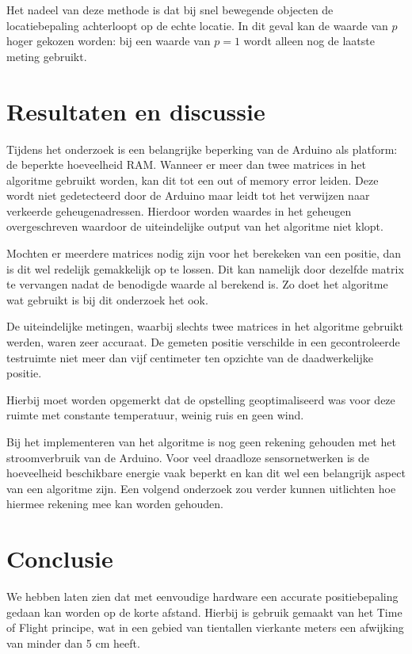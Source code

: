 \documentclass[a4paper,10pt]{article}
\begin{document}
Het nadeel van deze methode is dat bij snel bewegende objecten de locatiebepaling achterloopt op de echte locatie. In dit geval kan de waarde van $p$ hoger gekozen worden: bij een waarde van $p = 1$ wordt alleen nog de laatste meting gebruikt.

\section{Resultaten en discussie}\label{sec:resultaten}
Tijdens het onderzoek is een belangrijke beperking van de Arduino als platform: de beperkte hoeveelheid RAM. Wanneer er meer dan twee matrices in het algoritme gebruikt worden, kan dit tot een out of memory error leiden. Deze wordt niet gedetecteerd door de Arduino maar leidt tot het verwijzen naar verkeerde geheugenadressen. Hierdoor worden waardes in het geheugen overgeschreven waardoor de uiteindelijke output van het algoritme niet klopt.

Mochten er meerdere matrices nodig zijn voor het berekeken van een positie, dan is dit wel redelijk gemakkelijk op te lossen. Dit kan namelijk door dezelfde matrix te vervangen nadat de benodigde waarde al berekend is. Zo doet het algoritme wat gebruikt is bij dit onderzoek het ook.

De uiteindelijke metingen, waarbij slechts twee matrices in het algoritme gebruikt werden, waren zeer accuraat. De gemeten positie verschilde in een gecontroleerde testruimte niet meer dan vijf centimeter ten opzichte van de daadwerkelijke positie.

Hierbij moet worden opgemerkt dat de opstelling geoptimaliseerd was voor deze ruimte met constante temperatuur, weinig ruis en geen wind.

Bij het implementeren van het algoritme is nog geen rekening gehouden met het stroomverbruik van de Arduino. Voor veel draadloze sensornetwerken is de hoeveelheid beschikbare energie vaak beperkt en kan dit wel een belangrijk aspect van een algoritme zijn. Een volgend onderzoek zou verder kunnen uitlichten hoe hiermee rekening mee kan worden gehouden.

\section{Conclusie}\label{sec:conclusie}
We hebben laten zien dat met eenvoudige hardware een accurate positiebepaling gedaan kan worden op de korte afstand. Hierbij is gebruik gemaakt van het Time of Flight principe, wat in een gebied van tientallen vierkante meters een afwijking van minder dan 5 cm heeft.
\end{document}
